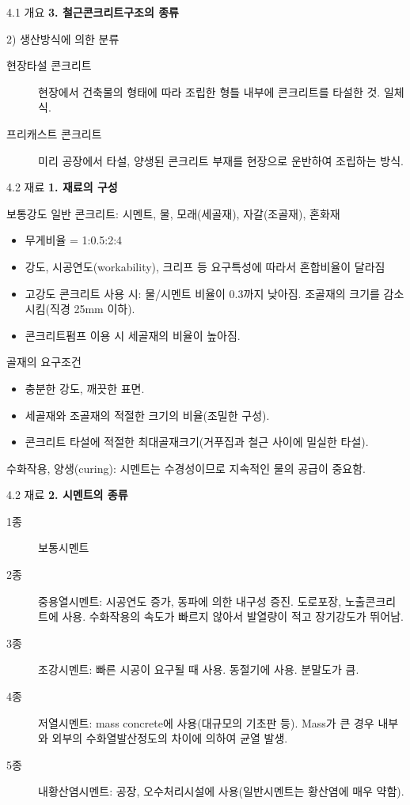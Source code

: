 \documentclass[9pt]{beamer}
\begin{document}
\begin{frame}{4.1 개요}
\textbf{3. 철근콘크리트구조의 종류}

\alert{2) 생산방식에 의한 분류}

\begin{description}
	\item[현장타설 콘크리트] 현장에서 건축물의 형태에 따라 조립한 형틀 내부에 콘크리트를 타설한 것. 일체식.
	\item[프리캐스트 콘크리트] 미리 공장에서 타설, 양생된 콘크리트 부재를 현장으로 운반하여 조립하는 방식. 
\end{description}
\end{frame}
\begin{frame}{4.2 재료}
\textbf{1. 재료의 구성}

보통강도 일반 콘크리트: 시멘트, 물, 모래(세골재), 자갈(조골재), 혼화재
\begin{itemize}
	\item 무게비율 = 1:0.5:2:4
	\item 강도, 시공연도(workability), 크리프 등 요구특성에 따라서 혼합비율이 달라짐
	\item 고강도 콘크리트 사용 시: 물/시멘트 비율이 0.3까지 낮아짐. 조골재의 크기를 감소시킴(직경 25mm 이하).
	\item 콘크리트펌프 이용 시 세골재의 비율이 높아짐.
\end{itemize}
골재의 요구조건
\begin{itemize}
	\item 충분한 강도, 깨끗한 표면.
	\item 세골재와 조골재의 적절한 크기의 비율(조밀한 구성).
	\item 콘크리트 타설에 적절한 최대골재크기(거푸집과 철근 사이에 밀실한 타설).
\end{itemize}
수화작용, 양생(curing): 시멘트는 수경성이므로 지속적인 물의 공급이 중요함. 
\end{frame}
\begin{frame}{4.2 재료}
\textbf{2. 시멘트의 종류}
\begin{description}
	\item[1종] 보통시멘트
	\item[2종] 중용열시멘트: 시공연도 증가, 동파에 의한 내구성 증진. 도로포장, 노출콘크리트에 사용. 수화작용의 속도가 빠르지 않아서 발열량이 적고 장기강도가 뛰어남. 
	\item[3종] 조강시멘트: 빠른 시공이 요구될 때 사용. 동절기에 사용. 분말도가 큼.
	\item[4종] 저열시멘트: mass concrete에 사용(대규모의 기초판 등). Mass가 큰 경우 내부와 외부의 수화열발산정도의 차이에 의하여 균열 발생. 
	\item[5종] 내황산염시멘트: 공장, 오수처리시설에 사용(일반시멘트는 황산염에 매우 약함). 
\end{description}
\end{frame}
\end{document}
